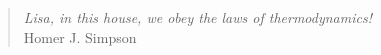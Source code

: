 \phantom{.}
\vspace{4in}

\begin{singlespace}
\begin{quote}
  \textit{Lisa, in this house, we obey the laws of thermodynamics!}\\
  \hfill{Homer J. Simpson}
\end{quote}
\end{singlespace}

%
